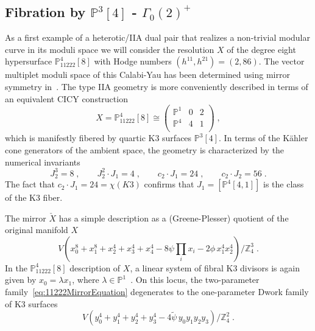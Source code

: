 \documentclass[11pt,a4paper]{article}
\numberwithin{equation}{section}
\numberwithin{table}{section}\setlength{\multlinegap}{25pt}
\begin{document}
\subsection{Fibration by \texorpdfstring{$\mathbb{P}^3[4]$}{quartic K3} - \texorpdfstring{$\Gamma_0(2)^+$}{Gamma0+(2)}}
\label{subsec:11222}

As a first example of a heterotic/IIA dual pair that realizes a non-trivial modular curve in its moduli space we will consider the resolution $X$ of the degree eight hypersurface $\mathbb{P}_{11222}^4[8]$ with Hodge numbers $(h^{11},h^{21})=(2,86)$. The vector multiplet moduli space of this Calabi-Yau has been determined using mirror symmetry in~\cite{Candelas:1993dm}. The type IIA geometry is more conveniently described in terms of an equivalent CICY construction~\cite{Schimmrigk:1989tz}
\begin{equation}
    X=\mathbb{P}_{11222}^4[8]\cong
    \left(
    \begin{array}{c|cc}
        \mathbb{P}^1 & 0 & 2\\
        \mathbb{P}^4 & 4 & 1\\
    \end{array}
    \right)\;,
\end{equation}
which is manifestly fibered by quartic K3 surfaces $\mathbb{P}^3[4]$. In terms of the Kähler cone generators of the ambient space, the geometry is characterized by the numerical invariants
\begin{equation}
    \label{eq:11222Intersections}
    J_2^3=8\;,\qquad J_2^2\cdot J_1=4\;,\qquad c_2\cdot J_1=24\;,\qquad c_2\cdot J_2=56\;.
\end{equation}
The fact that $c_2\cdot J_1=24=\chi(K3)$ confirms that $J_1=\left[\mathbb{P}^4[4,1]\right]$ is the class of the K3 fiber. 

The mirror $\check{X}$ has a simple description as a (Greene-Plesser) quotient of the original manifold $X$~\cite{Candelas:1993dm}
\begin{equation}
    \label{eq:11222MirrorEquation}
    V\left(x_0^8+x_1^8+x_2^4+x_3^4+x_4^4-8\psi\prod_{i} x_i-2\phi\, x_1^4x_2^4\right)\Big/\mathbb{Z}_4^3\;.
\end{equation}
In the $\mathbb{P}^4_{11222}[8]$ description of $X$, a linear system of fibral K3 divisors is again given by $x_0=\lambda x_1$, where $\lambda\in\mathbb{P}^1$~\cite{Candelas:1993dm,Klemm:1995tj}. On this locus, the two-parameter family~\eqref{eq:11222MirrorEquation} degenerates to the one-parameter Dwork family of K3 surfaces
\begin{equation}
\label{eq:MirrorQuarticK3}
    V\left(y_0^4+y_1^4+y_2^4+y_3^4-4\tilde{\psi}\,y_0y_1y_2y_3\right)\big/\mathbb{Z}_4^2\;.
\end{equation}
\end{document}
